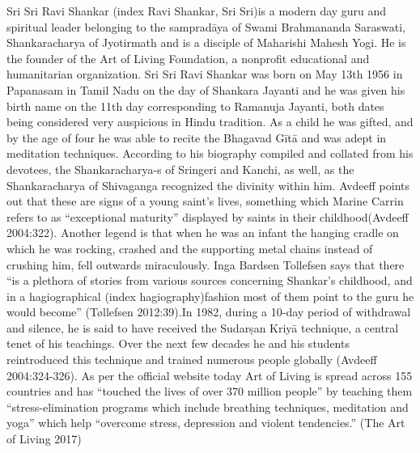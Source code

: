 Sri Sri Ravi Shankar (index Ravi Shankar, Sri Sri)is a modern day guru and spiritual leader belonging to the sampradāya of Swami Brahmananda Saraswati, Shankaracharya of Jyotirmath and is a disciple of Maharishi Mahesh Yogi. He is the founder of the Art of Living Foundation, a nonprofit educational and humanitarian organization. Sri Sri Ravi Shankar was born on May 13th 1956 in Papanasam in Tamil Nadu on the day of Shankara Jayanti and he was given his birth name on the 11th day corresponding to Ramanuja Jayanti, both dates being considered very auspicious in Hindu tradition. As a child he was gifted, and by the age of four he was able to recite the Bhagavad Gītā and was adept in meditation techniques. According to his biography compiled and collated from his devotees, the Shankaracharya-s of Sringeri and Kanchi, as well, as the Shankaracharya of Shivaganga recognized the divinity within him. Avdeeff points out that these are signs of a young saint’s lives, something which Marine Carrin refers to as “exceptional maturity” displayed by saints in their childhood(Avdeeff 2004:322). Another legend is that when he was an infant the hanging cradle on which he was rocking, crashed and the supporting metal chains instead of crushing him, fell outwards miraculously. Inga Bardsen Tollefsen says that there “is a plethora of stories from various sources concerning Shankar’s childhood, and in a hagiographical (index hagiography)fashion most of them point to the guru he would become” (Tøllefsen 2012:39).In 1982, during a 10-day period of withdrawal and silence, he is said to have received the Sudarṣan Kriyā technique, a central tenet of his teachings. Over the next few decades he and his students reintroduced this technique and trained numerous people globally (Avdeeff 2004:324-326). As per the official website today Art of Living is spread across 155 countries and has “touched the lives of over 370 million people” by teaching them “stress-elimination programs which include breathing techniques, meditation and yoga” which help “overcome stress, depression and violent tendencies.” (The Art of Living 2017)

